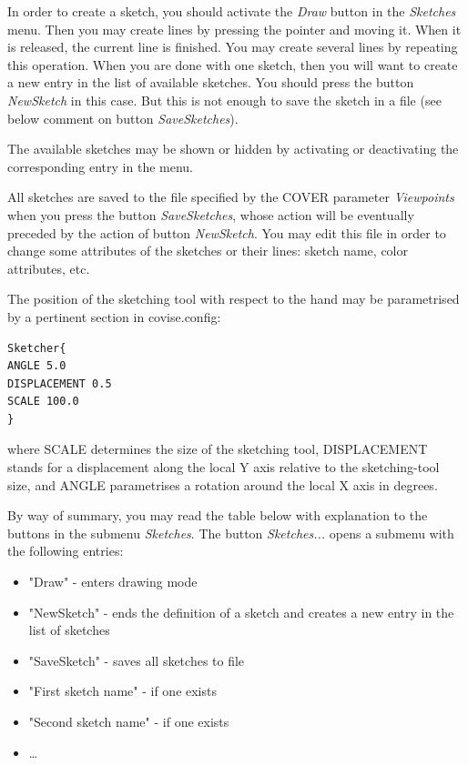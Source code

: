 In order to create a sketch, you should activate the {\sl Draw} button
in the {\sl Sketches} menu. Then you may create lines by pressing the
pointer and moving it. When it is released, the current line is finished.
You may create several lines by repeating this operation. When you
are done with one sketch, then you will want to create a new entry
in the list of available sketches. You should press the button {\sl NewSketch}
in this case. But this is not enough to save the sketch in a file
(see below comment on button {\sl SaveSketches}).

The available sketches may be shown or hidden by activating
or deactivating the corresponding entry in the menu.

All sketches are saved to the file specified by 
the COVER parameter {\sl Viewpoints} when you press the button
{\sl SaveSketches}, whose action will be eventually preceded
by the action of button {\sl NewSketch}. 
You may edit this file in order to change
some attributes of the sketches or their lines: sketch name,
color attributes, etc.

The position of the sketching tool with respect to the hand may
be parametrised by a pertinent section in covise.config:
\begin{verbatim}
Sketcher{
ANGLE 5.0
DISPLACEMENT 0.5
SCALE 100.0
}
\end{verbatim}
where SCALE determines the size of the sketching tool,
DISPLACEMENT stands for a displacement along the local Y axis
relative to the sketching-tool size,
and ANGLE parametrises a rotation around the local X axis in degrees.

By way of summary, you may read the table below with explanation to the
buttons in the submenu {\sl Sketches}.
The button {\sl Sketches...} opens a submenu with the following entries:
\begin {itemize}
\item "Draw" - enters drawing mode
\item "NewSketch" - ends the definition of a sketch and creates a new entry in the list of sketches
\item "SaveSketch" - saves all sketches to file
\item "First sketch name" - if one exists
\item "Second sketch name" - if one exists
\item   \ldots
\end {itemize}


